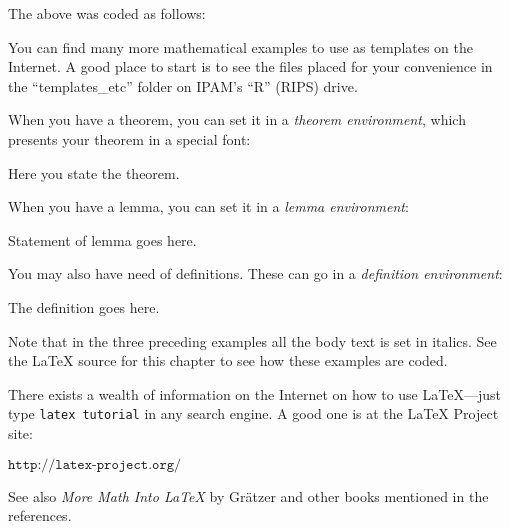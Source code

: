 \noindent
The above was coded as follows:

\vspace{\skipl}
\vspace{\skipl}

You can find many more mathematical examples to use as templates on the Internet.
A good place to start is to see the files placed for your convenience in the ``templates\_etc'' folder on IPAM's ``R''  (RIPS) drive.

When you have a theorem, you can set it in a {\em theorem environment}, which
presents your theorem in a special font:

\begin{theorem}
Here you state the theorem.
\end{theorem}

\noindent When you have a lemma, you can set it in a {\em lemma environment}:

\begin{lemma}
Statement of lemma goes here.
\end{lemma}

\noindent You may also have need of definitions.  These can go in a {\em definition environment}:

\begin{definition}
The definition goes here.
\end{definition}

\noindent Note that in the three preceding examples all the body text is set in italics.  See the {\LaTeX} source for this chapter to see how these examples are coded.

\vspace{8pt}

There exists a wealth of information on the Internet on how to use {\LaTeX}---just type {\tt latex tutorial} in any search engine.
A good one is at the LaTeX Project site:

\vspace{8pt}
$\texttt{http://latex-project.org/}$

\vspace{8pt}
\noindent See also \emph{More Math Into {\LaTeX}} by Gr\"{a}tzer
\cite{gratzer} and other books mentioned in the references.


 \endinput
